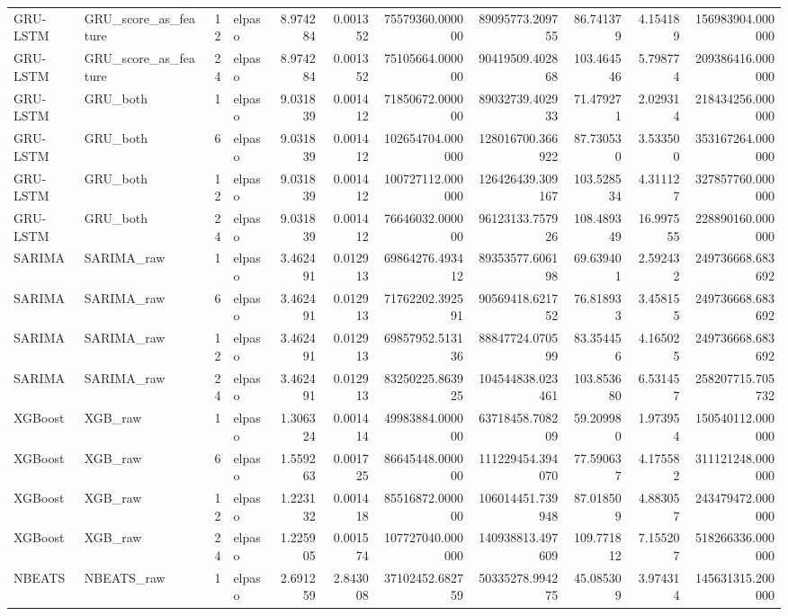 \begin{longtable}{llrlrrrrrrr}
GRU-LSTM & GRU\_score\_as\_feature & 12 & elpaso & 8.974284 & 0.001352 & 75579360.000000 & 89095773.209755 & 86.741379 & 4.154189 & 156983904.000000 \\
GRU-LSTM & GRU\_score\_as\_feature & 24 & elpaso & 8.974284 & 0.001352 & 75105664.000000 & 90419509.402868 & 103.464546 & 5.798774 & 209386416.000000 \\
GRU-LSTM & GRU\_both & 1 & elpaso & 9.031839 & 0.001412 & 71850672.000000 & 89032739.402933 & 71.479271 & 2.029314 & 218434256.000000 \\
GRU-LSTM & GRU\_both & 6 & elpaso & 9.031839 & 0.001412 & 102654704.000000 & 128016700.366922 & 87.730530 & 3.533500 & 353167264.000000 \\
GRU-LSTM & GRU\_both & 12 & elpaso & 9.031839 & 0.001412 & 100727112.000000 & 126426439.309167 & 103.528534 & 4.311127 & 327857760.000000 \\
GRU-LSTM & GRU\_both & 24 & elpaso & 9.031839 & 0.001412 & 76646032.000000 & 96123133.757926 & 108.489349 & 16.997555 & 228890160.000000 \\
SARIMA & SARIMA\_raw & 1 & elpaso & 3.462491 & 0.012913 & 69864276.493412 & 89353577.606198 & 69.639401 & 2.592432 & 249736668.683692 \\
SARIMA & SARIMA\_raw & 6 & elpaso & 3.462491 & 0.012913 & 71762202.392591 & 90569418.621752 & 76.818933 & 3.458155 & 249736668.683692 \\
SARIMA & SARIMA\_raw & 12 & elpaso & 3.462491 & 0.012913 & 69857952.513136 & 88847724.070599 & 83.354456 & 4.165025 & 249736668.683692 \\
SARIMA & SARIMA\_raw & 24 & elpaso & 3.462491 & 0.012913 & 83250225.863925 & 104544838.023461 & 103.853680 & 6.531457 & 258207715.705732 \\
XGBoost & XGB\_raw & 1 & elpaso & 1.306324 & 0.001414 & 49983884.000000 & 63718458.708209 & 59.209980 & 1.973954 & 150540112.000000 \\
XGBoost & XGB\_raw & 6 & elpaso & 1.559263 & 0.001725 & 86645448.000000 & 111229454.394070 & 77.590637 & 4.175582 & 311121248.000000 \\
XGBoost & XGB\_raw & 12 & elpaso & 1.223132 & 0.001418 & 85516872.000000 & 106014451.739948 & 87.018509 & 4.883057 & 243479472.000000 \\
XGBoost & XGB\_raw & 24 & elpaso & 1.225905 & 0.001574 & 107727040.000000 & 140938813.497609 & 109.771812 & 7.155207 & 518266336.000000 \\
NBEATS & NBEATS\_raw & 1 & elpaso & 2.691259 & 2.843008 & 37102452.682759 & 50335278.994275 & 45.085309 & 3.974314 & 145631315.200000 \\

\end{longtable}
